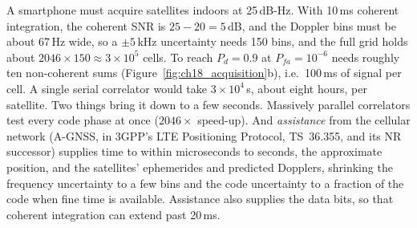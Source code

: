 \begin{worked}
A smartphone must acquire satellites indoors at 25\,dB-Hz. With 10\,ms coherent integration,
the coherent SNR is $25-20=5$\,dB, and the Doppler bins must be about 67\,Hz wide, so a
$\pm5$\,kHz uncertainty needs 150 bins, and the full grid holds about $2046\times150\approx
3\times10^5$ cells. To reach $P_d=0.9$ at $P_{fa}=10^{-6}$ needs roughly ten non-coherent
sums (Figure~\ref{fig:ch18_acquisition}b), i.e.\ 100\,ms of signal per cell. A single serial
correlator would take $3\times10^4$\,s, about eight hours, per satellite. Two things bring it
down to a few seconds. Massively parallel correlators test every code phase at once
($2046\times$ speed-up). And \emph{assistance} from the cellular network (A-GNSS, in 3GPP's
LTE Positioning Protocol, TS~36.355, and its NR successor) supplies time to within
microseconds to seconds, the approximate position, and the satellites' ephemerides and
predicted Dopplers, shrinking the frequency uncertainty to a few bins and the code
uncertainty to a fraction of the code when fine time is available. Assistance also supplies
the data bits, so that coherent integration can extend past 20\,ms.
\end{worked}

